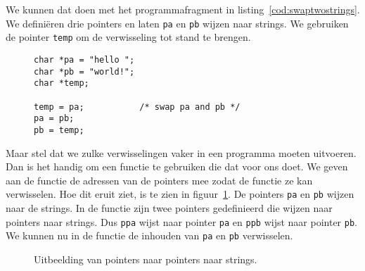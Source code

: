 We kunnen dat doen met het programmafragment in listing~\ref{cod:swaptwostrings}. We definiëren drie pointers en laten \texttt{pa} en \texttt{pb} wijzen naar strings. We gebruiken de pointer \texttt{temp} om de verwisseling tot stand te brengen.

\begin{figure}[!ht]
\begin{lstlisting}[caption=Verwisselen van twee pointers.,label=cod:swaptwostrings]
char *pa = "hello ";
char *pb = "world!";
char *temp;

temp = pa;           /* swap pa and pb */
pa = pb;
pb = temp;
\end{lstlisting}
\end{figure}

Maar stel dat we zulke verwisselingen vaker in een programma moeten uitvoeren. Dan is het handig om een functie te gebruiken die dat voor ons doet. We geven aan de functie de adressen van de pointers mee zodat de functie ze kan verwisselen. Hoe dit eruit ziet, is te zien in figuur~\ref{fig:poipointertopointerstring}. De pointers \texttt{pa} en \texttt{pb} wijzen naar de strings. In de functie zijn twee pointers gedefinieerd die wijzen naar pointers naar strings. Dus \texttt{ppa} wijst naar pointer \texttt{pa} en \texttt{ppb} wijst naar pointer \texttt{pb}. We kunnen nu in de functie de inhouden van \texttt{pa} en \texttt{pb} verwisselen.

\begin{figure}[!ht]
\centering
{}
\caption{Uitbeelding van pointers naar pointers naar strings.}
\label{fig:poipointertopointerstring}
\end{figure}


